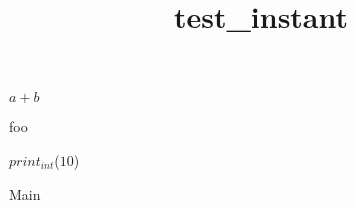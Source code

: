 \documentclass[8pt]{article}
\title{test\_instant}
\begin{document}
\maketitle
\begin{algorithm}[H]
\Return $ a + b $\;
\caption{foo}
\end{algorithm}

\begin{algorithm}[H]
$print_{int}$($ 10 $)\;
\caption{Main}
\end{algorithm}
\end{document}
